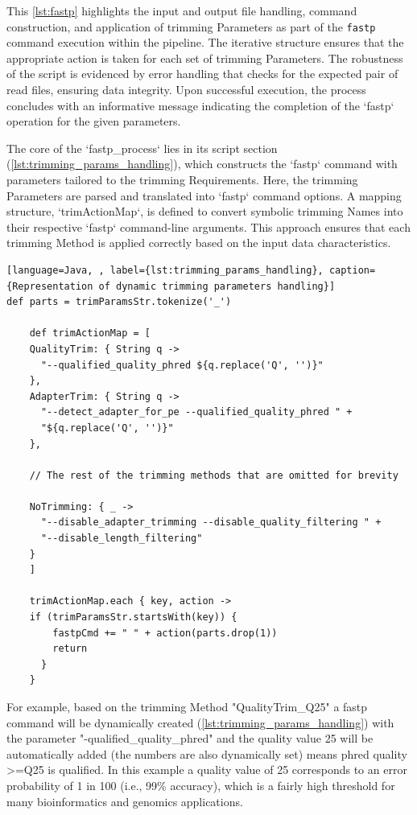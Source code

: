 This \autoref{lst:fastp} highlights the input and output file handling, command construction, and application of \gls{trimming} Parameters as part of the \texttt{fastp} command execution within the pipeline. The iterative structure ensures that the appropriate action is taken for each set of \gls{trimming} Parameters. The robustness of the script is evidenced by error handling that checks for the expected pair of \gls{read} files, ensuring data integrity. Upon successful execution, the process concludes with an informative message indicating the completion of the `fastp` operation for the given parameters.

The core of the `fastp\_process` lies in its script section (\autoref{lst:trimming_params_handling}), which constructs the `fastp` command with parameters tailored to the \gls{trimming} Requirements. Here, the \gls{trimming} Parameters are parsed and translated into `fastp` command options. A mapping structure, `trimActionMap`, is defined to convert symbolic \gls{trimming} Names into their respective `fastp` command-line arguments. This approach ensures that each \gls{trimming} Method is applied correctly based on the input data characteristics. 


\begin{lstlisting}[language=Java, , label={lst:trimming_params_handling}, caption={Representation of dynamic trimming parameters handling}]
def parts = trimParamsStr.tokenize('_')

    def trimActionMap = [
    QualityTrim: { String q -> 
      "--qualified_quality_phred ${q.replace('Q', '')}" 
    },
    AdapterTrim: { String q -> 
      "--detect_adapter_for_pe --qualified_quality_phred " +
      "${q.replace('Q', '')}" 
    },
    
    // The rest of the trimming methods that are omitted for brevity
    
    NoTrimming: { _ -> 
      "--disable_adapter_trimming --disable_quality_filtering " +
      "--disable_length_filtering" 
    }
    ]

    trimActionMap.each { key, action ->
    if (trimParamsStr.startsWith(key)) {
        fastpCmd += " " + action(parts.drop(1))
        return
      }
    }
\end{lstlisting}

For example, based on the \gls{trimming} Method "QualityTrim\_Q25" a fastp command will be dynamically created (\autoref{lst:trimming_params_handling}) with the parameter "-qualified\_quality\_phred" and the quality value 25 will be automatically added (the numbers are also dynamically set) means phred quality >=Q25 is qualified. In this example a quality value of 25 corresponds to an error probability of 1 in 100 (i.e., 99\% accuracy), which is a fairly high threshold for many bioinformatics and genomics applications.


